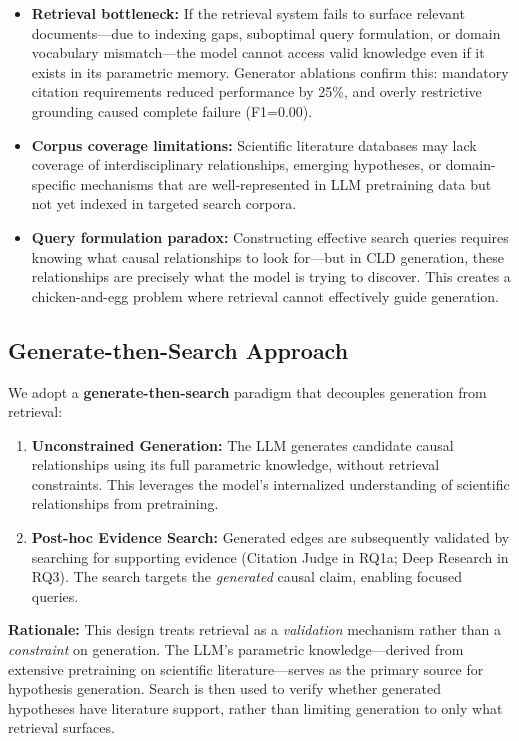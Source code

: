 \begin{itemize}[noitemsep]
    \item \textbf{Retrieval bottleneck:} If the retrieval system fails to surface relevant documents---due to indexing gaps, suboptimal query formulation, or domain vocabulary mismatch---the model cannot access valid knowledge even if it exists in its parametric memory. Generator ablations confirm this: mandatory citation requirements reduced performance by 25\%, and overly restrictive grounding caused complete failure (F1=0.00).
    \item \textbf{Corpus coverage limitations:} Scientific literature databases may lack coverage of interdisciplinary relationships, emerging hypotheses, or domain-specific mechanisms that are well-represented in LLM pretraining data but not yet indexed in targeted search corpora.
    \item \textbf{Query formulation paradox:} Constructing effective search queries requires knowing what causal relationships to look for---but in CLD generation, these relationships are precisely what the model is trying to discover. This creates a chicken-and-egg problem where retrieval cannot effectively guide generation.
\end{itemize}

\subsection{Generate-then-Search Approach}

We adopt a \textbf{generate-then-search} paradigm that decouples generation from retrieval:

\begin{enumerate}[noitemsep]
    \item \textbf{Unconstrained Generation:} The LLM generates candidate causal relationships using its full parametric knowledge, without retrieval constraints. This leverages the model's internalized understanding of scientific relationships from pretraining.
    \item \textbf{Post-hoc Evidence Search:} Generated edges are subsequently validated by searching for supporting evidence (Citation Judge in RQ1a; Deep Research in RQ3). The search targets the \textit{generated} causal claim, enabling focused queries.
\end{enumerate}

\textbf{Rationale:} This design treats retrieval as a \textit{validation} mechanism rather than a \textit{constraint} on generation. The LLM's parametric knowledge---derived from extensive pretraining on scientific literature---serves as the primary source for hypothesis generation. Search is then used to verify whether generated hypotheses have literature support, rather than limiting generation to only what retrieval surfaces.

